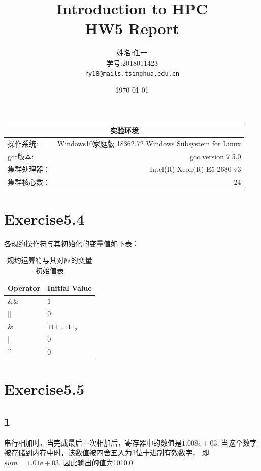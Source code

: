 \documentclass[UTF8]{article}
\title{Introduction to HPC \\ HW5 Report} %
\author{姓名:任一  \\学号:2018011423\\ \texttt{ry18@mails.tsinghua.edu.cn}} %
\date{\today} %
\begin{document}
\maketitle %
\begin{center}
    \begin{tabular}{l  r}
    \hline
        \multicolumn{2}{c}{实验环境} \\ \hline
        操作系统: & Windows10家庭版 18362.72 Windows Subsystem for Linux \\ \hline%
        gcc版本: & gcc version 7.5.0 \\ \hline%
        集群处理器：&Intel(R) Xeon(R)  E5-2680 v3\\ \hline
        集群核心数：&24\\ \hline
    \end{tabular}
\end{center}
\newpage

\section{Exercise5.4}
各规约操作符与其初始化的变量值如下表：
\begin{table}[h]
    \label{tab:my-table}
    \centering
    \caption{规约运算符与其对应的变量初始值表}
    \begin{tabular}{|l|l|}
    \hline
    Operator           & Initial Value \\ \hline
    \&\&               & $1$             \\ \hline
    ||                 & $0$             \\ \hline
    \&                 & $111...111_2$     \\ \hline
    |                  & $0$             \\ \hline
    \textasciicircum{} & $0$             \\ \hline
    \end{tabular}
    \end{table}

\section{Exercise5.5}
\subsection{1}
串行相加时，当完成最后一次相加后，寄存器中的数值是$1.008e+03$, 
当这个数字被存储到内存中时，该数值被四舍五入为3位十进制有效数字，
即$sum = 1.01e+03$. 因此输出的值为1010.0.
\end{document}
